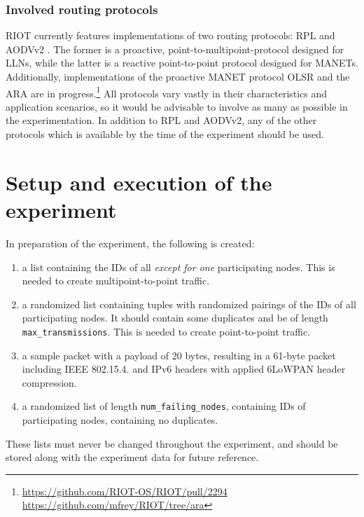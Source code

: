 \documentclass{acm_proc_article-sp}
\begin{document}
\subsubsection{Involved routing protocols}
\label{subsec:protocols}
RIOT currently features implementations of two routing protocols: RPL \cite{RFC-6550} and AODVv2 \cite{draft-ietf-manet-aodvv2-09}. The former is a proactive, point-to-multipoint-protocol designed for \glspl{LLN}, while the latter is a reactive point-to-point protocol designed for \glspl{MANET}. Additionally, implementations of the proactive \gls{MANET} protocol OLSR\cite{RFC-3626} and the \gls{ARA}\cite{ara} are in progress.\footnote{ \url{https://github.com/RIOT-OS/RIOT/pull/2294}\\  \url{https://github.com/mfrey/RIOT/tree/ara}}
All protocols vary vastly in their characteristics and application scenarios, so it would be advisable to involve as many as possible in the experimentation. In addition to RPL and AODVv2, any of the other protocols which is available by the time of the experiment should be used.

\section{Setup and execution of the experiment}
\label{sec:setup}
In preparation of the experiment, the following is created:
\begin{enumerate}
\item a list containing the IDs of all \emph{except for one} participating nodes. This is needed to create multipoint-to-point traffic.
\item a randomized list containing tuples with randomized pairings of the IDs of all participating nodes. It should contain some duplicates and be of length \texttt{max\_transmissions}. This is needed to create point-to-point traffic.
\item a sample packet with a payload of 20 bytes, resulting in a 61-byte packet including IEEE 802.15.4. and IPv6 headers with applied 6LoWPAN header compression.
\item a randomized list of length \texttt{num\_failing\_nodes}, containing IDs of participating nodes, containing no duplicates.
\end{enumerate}
These lists must never be changed throughout the experiment, and should be stored along with the experiment data for future reference.\\
\end{document}
